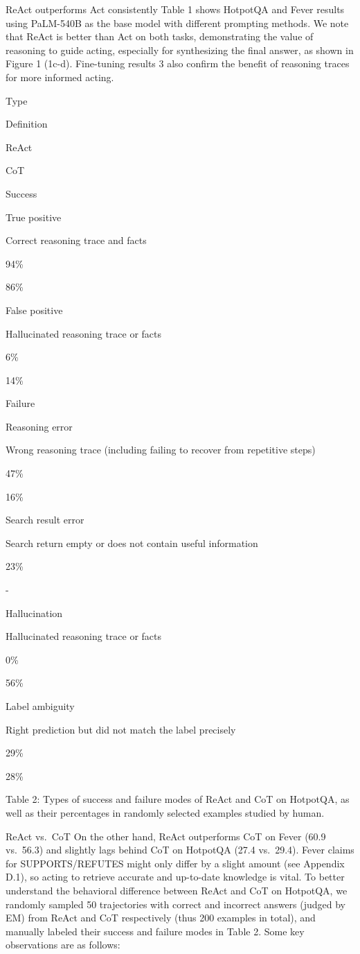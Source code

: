 \documentclass[
]{article}
\begin{document}
ReAct outperforms Act consistently Table 1 shows HotpotQA and Fever
results using PaLM-540B as the base model with different prompting
methods. We note that ReAct is better than Act on both tasks,
demonstrating the value of reasoning to guide acting, especially for
synthesizing the final answer, as shown in Figure 1 (1c-d). Fine-tuning
results 3 also confirm the benefit of reasoning traces for more informed
acting.

Type

Definition

ReAct

CoT

Success

True positive

Correct reasoning trace and facts

94\%

86\%

False positive

Hallucinated reasoning trace or facts

6\%

14\%

Failure

Reasoning error

Wrong reasoning trace (including failing to recover from repetitive
steps)

47\%

16\%

Search result error

Search return empty or does not contain useful information

23\%

-

Hallucination

Hallucinated reasoning trace or facts

0\%

56\%

Label ambiguity

Right prediction but did not match the label precisely

29\%

28\%

Table 2: Types of success and failure modes of ReAct and CoT on
HotpotQA, as well as their percentages in randomly selected examples
studied by human.

ReAct vs.~CoT On the other hand, ReAct outperforms CoT on Fever (60.9
vs.~56.3) and slightly lags behind CoT on HotpotQA (27.4 vs.~29.4).
Fever claims for SUPPORTS/REFUTES might only differ by a slight amount
(see Appendix D.1), so acting to retrieve accurate and up-to-date
knowledge is vital. To better understand the behavioral difference
between ReAct and CoT on HotpotQA, we randomly sampled 50 trajectories
with correct and incorrect answers (judged by EM) from ReAct and CoT
respectively (thus 200 examples in total), and manually labeled their
success and failure modes in Table 2. Some key observations are as
follows:
\end{document}
